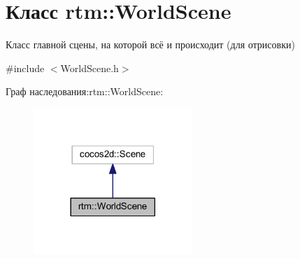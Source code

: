 \hypertarget{classrtm_1_1_world_scene}{}\section{Класс rtm\+:\+:World\+Scene}
\label{classrtm_1_1_world_scene}


Класс главной сцены, на которой всё и происходит (для отрисовки)  




{\ttfamily \#include $<$World\+Scene.\+h$>$}



Граф наследования\+:rtm\+:\+:World\+Scene\+:
\nopagebreak
\begin{figure}[H]
\begin{center}
\leavevmode
\includegraphics[width=170pt]{classrtm_1_1_world_scene__inherit__graph}
\end{center}
\end{figure}
